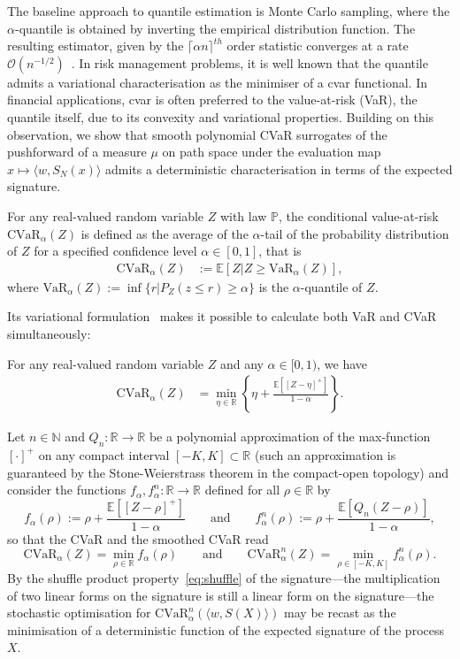 \documentclass[twoside,11pt]{article}
\numberwithin{equation}{section}
\numberwithin{theorem}{section}
\newcommand{\R}{\mathbb{R}}
\newcommand{\N}{\mathbb{N}}
\newcommand{\ex}{\mathbb{E}}
\newcommand{\Oo}{\mathcal{O}}
\begin{document}
The baseline approach to quantile estimation is Monte Carlo sampling, where the $\alpha$-quantile is obtained by inverting the empirical distribution function. The resulting estimator, given by the ${\lceil \alpha n\rceil}^{th}$ order statistic converges at a rate $\Oo(n^{-1/2})$~\citep{serfling2009approximation}. In risk management problems, it is well known that the quantile admits a variational characterisation as the minimiser of a \acrlong{cvar} functional. In financial applications, \acrshort{cvar} is often preferred to the value-at-risk (VaR), the quantile itself, due to its convexity and variational properties. Building on this observation, we show that smooth polynomial CVaR surrogates of the pushforward of a measure $\mu$ on path space under the evaluation map $x\mapsto \langle w, S_N(x)\rangle$ admits a deterministic characterisation in terms of the expected signature. 



\begin{definition}[CVaR]
For any real-valued random variable
$Z$ with law $\mathbb P$, the conditional value-at-risk $\mathrm{CVaR}_{\alpha}(Z)$ is defined as the average of the $\alpha$-tail
of the probability distribution of $Z$ for a specified confidence level $\alpha \in [0,1]$, that is
\begin{align*}
    \mathrm{CVaR}_\alpha(Z) &:= \ex[Z|Z\geq \mathrm{VaR}_\alpha(Z)],
\end{align*}
where $\mathrm{VaR}_\alpha(Z):=\inf\{r|P_Z(z\leq r)\geq \alpha\}$ is the $\alpha$-quantile of $Z$.
\end{definition}
Its variational formulation~\citep{rockafellar2002conditional} makes it possible to calculate both VaR and CVaR simultaneously:
\begin{lemma}
    For any real-valued random variable $Z$ and any $\alpha \in [0,1)$, we have 
\begin{align*}
\mathrm{CVaR}_\alpha(Z) &=\min_{\eta\in \R} 
    \left\{\eta+ \frac{\ex[[Z-\eta]^+]}{1-\alpha}\right\}.
\end{align*}
\end{lemma}
Let $n\in\N$ and $Q_n:\R\rightarrow\R$ be a polynomial approximation of the max-function $[\cdot]^+$ on any compact interval $[-K,K]\subset \R$ (such an approximation is guaranteed by the Stone-Weierstrass theorem in the compact-open topology) and consider the functions $f_\alpha, f^n_\alpha:\R\to \R$ defined for all $\rho\in\R$ by
$$
f_\alpha(\rho):= \rho + \frac{\ex[[Z-\rho]^+]}{1-\alpha}
\qquad\text{and}\qquad  f^n_\alpha(\rho):= \rho + \frac{\ex[Q_n(Z-\rho)]}{1-\alpha}, 
$$
so that the CVaR and the smoothed CVaR read 
$$
\mathrm{CVaR}_\alpha(Z) = \min_{\rho \in \R} f_\alpha(\rho)
\qquad\text{and}\qquad  \mathrm{CVaR}^n_\alpha(Z) = \min_{\rho \in[-K,K]} f^n_\alpha(\rho).
$$
By the shuffle product property~\eqref{eq:shuffle} of the signature---the multiplication of two linear forms on the signature is still a linear form on the signature---the stochastic optimisation for $\mathrm{CVaR}^n_\alpha(\langle w,S(X)\rangle) $ may be recast as the minimisation of a deterministic function of the expected signature of the process $X$. 
\end{document}
